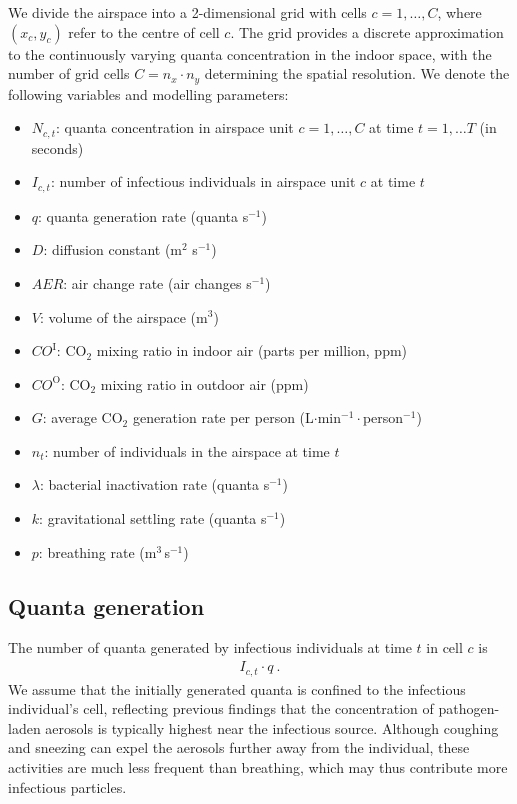 \documentclass[fleqn,11pt]{wlscirep_supp}
\begin{document}
We divide the airspace into a 2-dimensional grid with cells $c = 1, \dots, C$, where $(x_c, y_c)$ refer to the centre of cell $c$. The grid provides a discrete approximation to the continuously varying quanta concentration in the indoor space, with the number of grid cells $C = n_x \cdot n_y$ determining the spatial resolution. We denote the following variables and modelling parameters:
\begin{itemize}
    \item $N_{c,t}$: quanta concentration in airspace unit $c = 1, \dots, C$ at time $t = 1, \dots T$ (in seconds)
    \item $I_{c,t}$: number of infectious individuals in airspace unit $c$ at time $t$
    \item $q$: quanta generation rate (quanta s$^{-1}$)
    \item $D$: diffusion constant (m$^2$ s$^{-1}$)
    \item $AER$: air change rate (air changes s$^{-1}$)
    \item $V$: volume of the airspace (m$^3$)
    \item $CO^{\text{I}}$: CO$_2$ mixing ratio in indoor air (parts per million, ppm)
    \item $CO^{\text{O}}$: CO$_2$ mixing ratio in outdoor air (ppm)
    \item $G$: average CO$_2$ generation rate per person (L$\cdot$min$^{-1}\cdot$person$^{-1}$)
    \item $n_t$: number of individuals in the airspace at time $t$
    \item $\lambda$: bacterial inactivation rate (quanta s$^{-1}$)
    \item $k$: gravitational settling rate (quanta s$^{-1}$)
    \item $p$: breathing rate (m$^3$\,s$^{-1}$)
\end{itemize}

\subsection{Quanta generation}\label{sec:quanta-generation}

The number of quanta generated by infectious individuals at time $t$ in cell $c$ is 
\begin{align}\label{eq:generation}
    I_{c,t} \cdot q ~.
\end{align}
We assume that the initially generated quanta is confined to the infectious individual's cell, reflecting previous findings that the concentration of pathogen-laden aerosols is typically highest near the infectious source\cite{Wang2021Science,Morawska2021,Vuorinen2020SafSci,Chen2020BuildEnv}. Although coughing and sneezing can expel the aerosols further away from the individual, these activities are much less frequent than breathing, which may thus contribute more infectious particles\cite{Dinkele2022AJRCCM}. 
\end{document}
